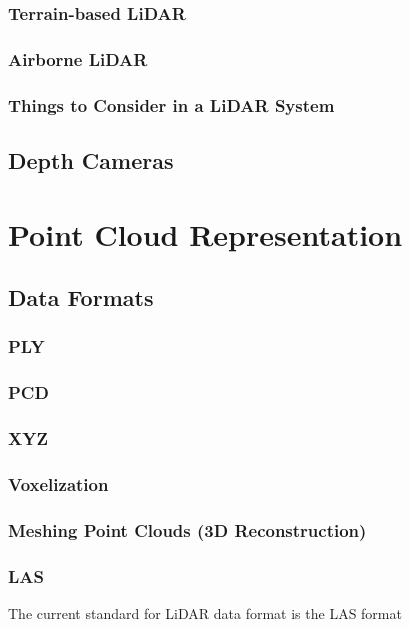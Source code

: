 \documentclass[a4paper, 11pt, twocolumn]{article}
\begin{document}
\subsubsection{Terrain-based LiDAR}

\subsubsection{Airborne LiDAR}

\subsubsection{Things to Consider in a LiDAR System}

\subsection{Depth Cameras}

\section{Point Cloud Representation}

\subsection{Data Formats}

\subsubsection{PLY}

\subsubsection{PCD}

\subsubsection{XYZ}

\subsubsection{Voxelization}

\subsubsection{Meshing Point Clouds (3D Reconstruction)}


\subsubsection{LAS}
The current standard for LiDAR data format is the LAS format
\end{document}
